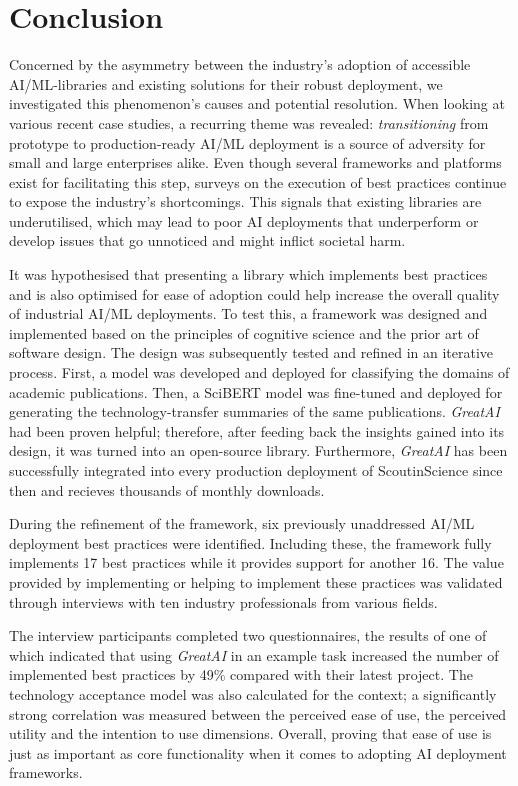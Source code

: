 \chapter{Conclusion} \label{chapter:conclusion}

Concerned by the asymmetry between the industry's adoption of accessible AI/ML-libraries and existing solutions for their robust deployment, we investigated this phenomenon's causes and potential resolution. When looking at various recent case studies, a recurring theme was revealed: \textit{transitioning} from prototype to production-ready AI/ML deployment is a source of adversity for small and large enterprises alike. Even though several frameworks and platforms exist for facilitating this step, surveys on the execution of best practices continue to expose the industry's shortcomings. This signals that existing libraries are underutilised, which may lead to poor AI deployments that underperform or develop issues that go unnoticed and might inflict societal harm.

It was hypothesised that presenting a library which implements best practices and is also optimised for ease of adoption could help increase the overall quality of industrial AI/ML deployments. To test this, a framework was designed and implemented based on the principles of cognitive science and the prior art of software design. The design was subsequently tested and refined in an iterative process. First, a model was developed and deployed for classifying the domains of academic publications. Then, a SciBERT model was fine-tuned and deployed for generating the technology-transfer summaries of the same publications. \textit{GreatAI} had been proven helpful; therefore, after feeding back the insights gained into its design, it was turned into an open-source library. Furthermore, \textit{GreatAI} has been successfully integrated into every production deployment of ScoutinScience since then and recieves thousands of monthly downloads.

During the refinement of the framework, six previously unaddressed AI/ML deployment best practices were identified. Including these, the framework fully implements 17 best practices while it provides support for another 16. The value provided by implementing or helping to implement these practices was validated through interviews with ten industry professionals from various fields.

The interview participants completed two questionnaires, the results of one of which indicated that using \textit{GreatAI} in an example task increased the number of implemented best practices by 49\% compared with their latest project. The technology acceptance model was also calculated for the context; a significantly strong correlation was measured between the perceived ease of use, the perceived utility and the intention to use dimensions. Overall, proving that ease of use is just as important as core functionality when it comes to adopting AI deployment frameworks.

